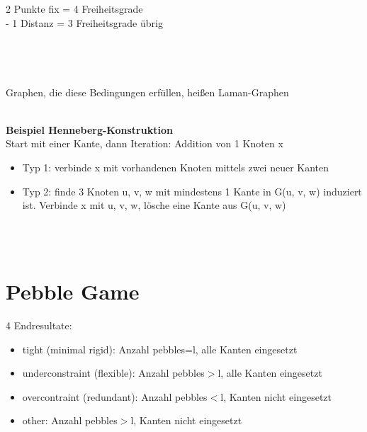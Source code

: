 \documentclass[12pt,a4paper]{article}
\begin{document}
2 Punkte fix = 4 Freiheitsgrade\\
- 1 Distanz = 3 Freiheitsgrade übrig\\

\\\\
\\\\
Graphen, die diese Bedingungen erfüllen, heißen Laman-Graphen
\\\\
\parbox{\linewidth}{\textbf{Beispiel Henneberg-Konstruktion}\\
Start mit einer Kante, dann Iteration: Addition von 1 Knoten x
\begin{itemize}
	\item Typ 1: verbinde x mit  vorhandenen Knoten mittels zwei neuer Kanten
	\item Typ 2: finde 3 Knoten u, v, w mit mindestens 1 Kante in G(u, v, w) induziert ist. Verbinde x mit u, v, w, lösche eine Kante aus G(u, v, w)
\end{itemize}
}
\\\\

\section{Pebble Game}
4 Endresultate:
\begin{itemize}
	\item tight (minimal rigid): Anzahl pebbles=l, alle Kanten eingesetzt
	\item underconstraint (flexible): Anzahl pebbles$>$l, alle Kanten eingesetzt
	\item overcontraint (redundant): Anzahl pebbles$<$l, Kanten nicht eingesetzt
	\item other: Anzahl pebbles$>$l, Kanten nicht eingesetzt
\end{itemize}
\end{document}
